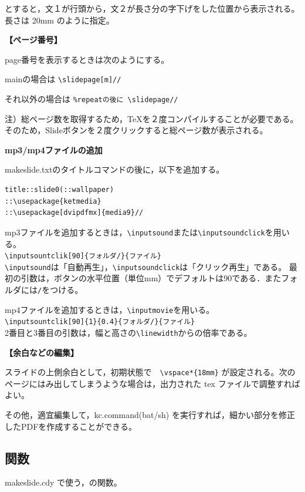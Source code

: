 \documentclass[papersize,a4paper,12pt,uplatex]{jsarticle}
\begin{document}
とすると，文１が行頭から，文２が長さ分の字下げをした位置から表示される。長さは 20mm のように指定。

\vspace{\baselineskip}
{\bf 【ページ番号】}

page番号を表示するときは次のようにする。
 
 mainの場合は \verb|\slidepage[m]//|
 
それ以外の場合は \verb|%repeatの後に \slidepage//|
 
 注）総ページ数を取得するため，TeXを２度コンパイルすることが必要である。そのため，Slideボタンを２度クリックすると総ページ数が表示される。

\vspace{\baselineskip}
{\bf mp3/mp4ファイルの追加}

makeslide.txtのタイトルコマンドの後に，以下を追加する。
\begin{verbatim}
title::slide0(::wallpaper)
::\usepackage{ketmedia}
::\usepackage[dvipdfmx]{media9}//
\end{verbatim}

mp3ファイルを追加するときは，\verb|\inputsound|または\verb|\inputsoundclick|を用いる。\\
\hspace{10mm}\verb|\inputsountclik[90]{フォルダ/}{ファイル}|\\
\verb|\inputsound|は「自動再生」，\verb|\inputsoundclick|は「クリック再生」である。
最初の引数は，ボタンの水平位置（単位mm）でデフォルトは90である．またフォルダには\verb|/|をつける。\vspace{2mm}

mp4ファイルを追加するときは，\verb|\inputmovie|を用いる。\\
\hspace{10mm}\verb|\inputsountclik[90]{1}{0.4}{フォルダ/}{ファイル}|\\
2番目と3番目の引数は，幅と高さの\verb|\linewidth|からの倍率である。

\vspace{\baselineskip}
{\bf 【余白などの編集】}

スライドの上側余白として，初期状態で　\verb|\vspace*{18mm}| が設定される。次のページにはみ出してしまうような場合は，出力された tex ファイルで調整すればよい。

その他，適宜編集して，kc.command(bat/sh) を実行すれば，細かい部分を修正したPDFを作成することができる。

\subsection{関数}
makeslide.cdy で使う，\ketcindy の関数。
\end{document}
